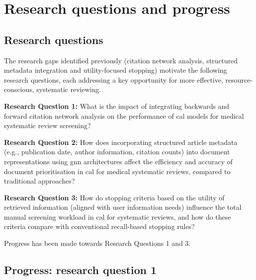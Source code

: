\documentclass[10pt,oneside]{book}
\begin{document}
\chapter{Research questions and progress}\label{sec:Research_Questions}

\section{Research questions}

The research gaps identified previously (citation network analysis, structured metadata integration and utility-focused stopping) motivate the following research questions, each addressing a key opportunity for more effective, resource-conscious, systematic reviewing.

\begin{tcolorbox}[colback=skyblue!10, colframe=skyblue, sharp corners=southwest, boxrule=0.8pt]
\textbf{Research Question 1:} What is the impact of integrating backwards and forward citation network analysis on the performance of \gls*{cal} models for medical systematic review screening?
\end{tcolorbox}
\vspace{1.5em}
\begin{tcolorbox}[colback=lightgreen!10, colframe=lightgreen, sharp corners=southwest, boxrule=0.8pt]
\textbf{Research Question 2:} How does incorporating structured article metadata (e.g., publication date, author information, citation counts) into document representations using \gls*{gnn} architectures affect the efficiency and accuracy of document prioritisation in \gls*{cal} for medical systematic reviews, compared to traditional approaches?
\end{tcolorbox}
\vspace{1.5em}
\begin{tcolorbox}[colback=salmon!10, colframe=salmon, sharp corners=southwest, boxrule=0.8pt]
\textbf{Research Question 3:} How do stopping criteria based on the utility of retrieved information (aligned with user information needs) influence the total manual screening workload in \gls*{cal} for systematic reviews, and how do these criteria compare with conventional recall-based stopping rules?
\end{tcolorbox}


Progress has been made towards Research Questions 1 and 3. 

\section{Progress: research question 1}
\end{document}
